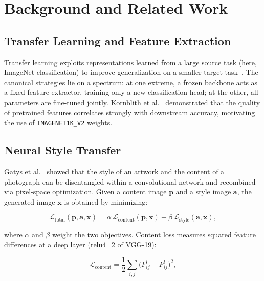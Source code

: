 \documentclass[conference]{IEEEtran}
\begin{document}
\section{Background and Related Work}
\label{sec:background}

\subsection{Transfer Learning and Feature Extraction}

Transfer learning exploits representations learned from a large source task (here,
ImageNet classification) to improve generalization on a smaller target task~\cite{tan2018transfer}.
The canonical strategies lie on a spectrum: at one extreme, a frozen backbone acts as a
fixed feature extractor, training only a new classification head; at the other, all
parameters are fine-tuned jointly.
Kornblith et al.~\cite{kornblith2019transfer} demonstrated that the quality of pretrained
features correlates strongly with downstream accuracy, motivating the use of
\texttt{IMAGENET1K\_V2} weights.

\subsection{Neural Style Transfer}

Gatys et al.~\cite{gatys2016nst} showed that the style of an artwork and the content of a
photograph can be disentangled within a convolutional network and recombined via pixel-space
optimization.
Given a content image $\mathbf{p}$ and a style image $\mathbf{a}$, the generated image
$\mathbf{x}$ is obtained by minimizing:

\begin{equation}
  \mathcal{L}_{\text{total}}(\mathbf{p}, \mathbf{a}, \mathbf{x}) =
  \alpha\,\mathcal{L}_{\text{content}}(\mathbf{p}, \mathbf{x}) +
  \beta\,\mathcal{L}_{\text{style}}(\mathbf{a}, \mathbf{x}),
  \label{eq:nst_total}
\end{equation}

where $\alpha$ and $\beta$ weight the two objectives.
Content loss measures squared feature differences at a deep layer (relu4\_2 of VGG-19):

\begin{equation}
  \mathcal{L}_{\text{content}} = \frac{1}{2}\sum_{i,j}
  \bigl(F^l_{ij} - P^l_{ij}\bigr)^2,
  \label{eq:content_loss}
\end{equation}
\end{document}
